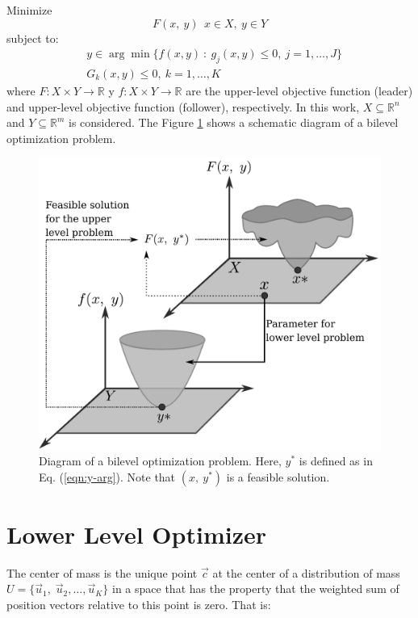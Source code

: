 \documentclass[conference]{IEEEtran}
\begin{document}
Minimize
\begin{equation}
    F(x,\ y) \ \ x \in X , \ y \in Y 
    \label{eqn:minF1}
\end{equation}
% 
subject to:
% 
\begin{align}
    \label{eqn:y-arg}
    &y \in \arg \min \{ f(x, y) \ : \ g_j(x, y) \leq 0, \ j = 1,\ldots, J \}\\
    &G_k(x, y)  \leq 0, \ k = 1,\ldots,K
    \label{eqn:G}
\end{align}
where $F: X \times Y \to \mathbb{R}$ y $f: X \times Y \to \mathbb{R}$
are the upper-level objective function (leader) and upper-level objective function (follower), respectively. In this work, $X \subseteq \mathbb{R}^n$ and $Y \subseteq \mathbb{R}^m$ is considered. The Figure \ref{fig:bilevel} shows a schematic diagram of a bilevel optimization problem.
% 
\begin{figure}[!ht]
    \centering
    \includegraphics[width=0.8\linewidth]{img/bilevel.pdf}
    \caption{Diagram of a bilevel optimization problem. Here, $y^*$ 
            is defined as in Eq. (\ref{eqn:y-arg}). Note that $(x,\ y^*)$
            is a feasible solution.}
    \label{fig:bilevel}
\end{figure}


\section{Lower Level Optimizer} %
\label{sec:eca}

The center of mass is the unique point $\vec{c}$ at the center of a distribution
of mass $U = \{\vec{u}_1,\; \vec{u}_2 , \ldots , \vec{u}_K \}$ in a space that 
has the property that the weighted sum of position vectors relative to this
point is zero. That is:
\end{document}
